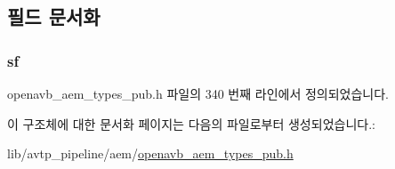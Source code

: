 \subsection{필드 문서화}
\subsubsection[{\texorpdfstring{sf}{sf}}]{ sf}\hypertarget{structopenavb__aem__stream__format__iec__61883__iidc__t_a153db177c2b7653917dff143e5f755e1}{}\label{structopenavb__aem__stream__format__iec__61883__iidc__t_a153db177c2b7653917dff143e5f755e1}


openavb\+\_\+aem\+\_\+types\+\_\+pub.\+h 파일의 340 번째 라인에서 정의되었습니다.



이 구조체에 대한 문서화 페이지는 다음의 파일로부터 생성되었습니다.\+:\begin{DoxyCompactItemize}
\item 
lib/avtp\+\_\+pipeline/aem/\hyperlink{openavb__aem__types__pub_8h}{openavb\+\_\+aem\+\_\+types\+\_\+pub.\+h}\end{DoxyCompactItemize}
